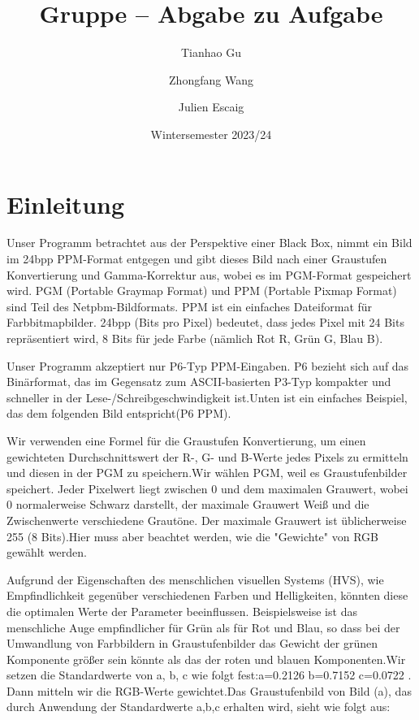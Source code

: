 \documentclass[course=erap]{aspdoc}
\author{Tianhao Gu \and Zhongfang Wang \and Julien Escaig}
\date{Wintersemester 2023/24} %
\title{Gruppe \theGroup{} -- Abgabe zu Aufgabe \theNumber}
\begin{document}
\section{Einleitung}

\par
Unser Programm betrachtet aus der Perspektive einer Black Box, nimmt ein Bild im 24bpp PPM-Format entgegen und gibt dieses Bild nach einer Graustufen Konvertierung und Gamma-Korrektur aus, wobei es im PGM-Format gespeichert wird. PGM (Portable Graymap Format) und PPM (Portable Pixmap Format) sind Teil des Netpbm-Bildformats. PPM ist ein einfaches Dateiformat für Farbbitmapbilder. 24bpp (Bits pro Pixel) bedeutet, dass jedes Pixel mit 24 Bits repräsentiert wird, 8 Bits für jede Farbe (nämlich Rot R, Grün G, Blau B). 
\par
Unser Programm akzeptiert nur P6-Typ PPM-Eingaben. P6 bezieht sich auf das Binärformat, das im Gegensatz zum ASCII-basierten P3-Typ kompakter und schneller in der Lese-/Schreibgeschwindigkeit ist.Unten ist ein einfaches Beispiel, das dem folgenden Bild entspricht(P6 PPM).

\par
Wir verwenden eine Formel für die Graustufen Konvertierung, um einen gewichteten Durchschnittswert der R-, G- und B-Werte jedes Pixels zu ermitteln und diesen in der PGM zu speichern.Wir wählen PGM, weil es Graustufenbilder speichert. Jeder Pixelwert liegt zwischen 0 und dem maximalen Grauwert, wobei 0 normalerweise Schwarz darstellt, der maximale Grauwert Weiß und die Zwischenwerte verschiedene Grautöne. Der maximale Grauwert ist üblicherweise 255 (8 Bits).Hier muss aber beachtet werden, wie die "Gewichte" von RGB gewählt werden. 
\par
Aufgrund der Eigenschaften des menschlichen visuellen Systems (HVS), wie Empfindlichkeit gegenüber verschiedenen Farben und Helligkeiten, könnten diese die optimalen Werte der Parameter beeinflussen. Beispielsweise ist das menschliche Auge empfindlicher für Grün als für Rot und Blau, so dass bei der Umwandlung von Farbbildern in Graustufenbilder das Gewicht der grünen Komponente größer sein könnte als das der roten und blauen Komponenten.Wir setzen die Standardwerte von a, b, c wie folgt fest:a=0.2126 b=0.7152 c=0.0722 . Dann mitteln wir die RGB-Werte gewichtet.Das Graustufenbild von Bild (a), das durch Anwendung der Standardwerte a,b,c erhalten wird, sieht wie folgt aus:
\end{document}
